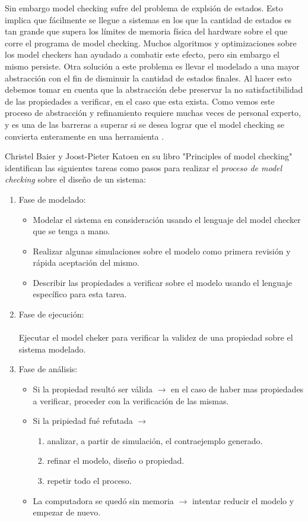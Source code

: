 \documentclass[titlepage, 12pt]{book}
\begin{document}
Sin embargo model checking sufre del problema de explsi\'on de estados. Esto implica que f\'acilmente se llegue a sistemas en los que la cantidad de estados es tan grande que supera los l\'imites de memoria f\'isica del hardware sobre el que corre el programa de model checking. Muchos algoritmos y optimizaciones sobre los model checkers han ayudado a combatir este efecto, pero sin embargo el mismo persiste. Otra soluci\'on a este problema es llevar el modelado a una mayor abstracci\'on con el fin de disminuir la cantidad de estados finales. Al hacer esto debemos tomar en cuenta que la abstracci\'on debe preservar la no satisfactibilidad de las propiedades a verificar, en el caso que esta exista. Como vemos este proceso de abstracci\'on y refinamiento requiere muchas veces de personal experto, y es una de las barreras a superar si se desea lograr que el model checking se convierta enteramente en una herramienta .

Christel Baier y Joost-Pieter Katoen en su libro "Principles of model checking" \cite{baier} identifican las siguientes tareas como pasos para realizar el \textit{proceso de model checking} sobre el dise\~no de un sistema:

\begin{enumerate}
\item Fase de modelado:
\begin{itemize}
\item Modelar el sistema en consideraci\'on usando el lenguaje del model checker que se tenga a mano.
\item Realizar algunas simulaciones sobre el modelo como primera revisi\'on y r\'apida aceptaci\'on del mismo.
\item Describir las propiedades a verificar sobre el modelo usando el lenguaje espec\'ifico para esta tarea.
\end{itemize}
\item Fase de ejecuci\'on:\\\\
Ejecutar el model cheker para verificar la validez de una propiedad sobre el sistema modelado. 
\item Fase de an\'alisis:
\begin{itemize}
\item Si la propiedad result\'o ser v\'alida $\longrightarrow$ en el caso de haber mas propiedades a verificar, proceder con la verificaci\'on de las mismas.
\item Si la pripiedad fu\'e refutada $\longrightarrow$
\begin{enumerate}
\item analizar, a partir de simulaci\'on, el contraejemplo generado.
\item refinar el modelo, diseño o propiedad.
\item repetir todo el proceso.
\end{enumerate}
\item La computadora se qued\'o sin memoria $\longrightarrow$ intentar reducir el modelo y empezar de nuevo.
\end{itemize}
\end{enumerate}
\end{document}
